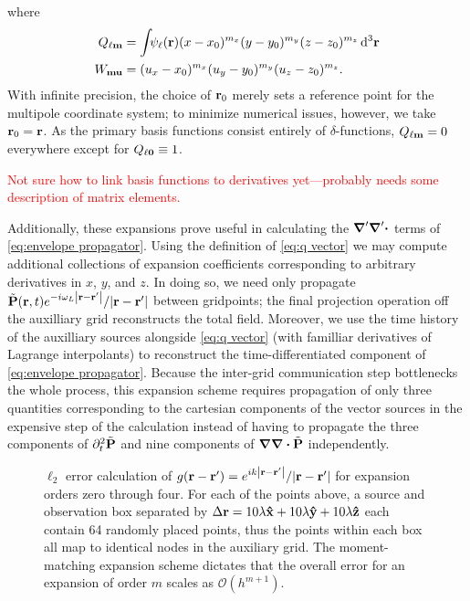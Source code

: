 where
\begin{subequations}
  \begin{align}
    Q_{\ell \vb{m}} &= \int_{} \psi_\ell(\vb{r}) (x - x_0)^{m_x} (y - y_0)^{m_y} (z - z_0)^{m_z} \dd[3]{\vb{r}} \label{eq:q vector}\\
    W_{\vb{m}\vb{u}} &= (u_x - x_0)^{m_x} (u_y - y_0)^{m_y} (u_z - z_0)^{m_z} \label{eq:w matrix}.
  \end{align}
\end{subequations}
With infinite precision, the choice of $\vb{r}_0$ merely sets a reference point for the multipole coordinate system; to minimize numerical issues, however, we take $\vb{r}_0 = \vb{r}$.
As the primary basis functions consist entirely of $\delta$-functions, $Q_{\ell\vb{m}} = 0$ everywhere except for $Q_{\ell \vb{0}} \equiv 1$.

\textcolor{red}{Not sure how to link basis functions to derivatives yet---probably needs some description of matrix elements.}

Additionally, these expansions prove useful in calculating the $\grad' \grad' \boldsymbol{\cdot}$ terms of \cref{eq:envelope propagator}.
Using the definition of \cref{eq:q vector} we may compute additional collections of expansion coefficients corresponding to arbitrary derivatives in $x$, $y$, and $z$.
In doing so, we need only propagate $\tilde{\vb{P}}(\vb{r}, t)e^{-i \omega_L \abs{\vb{r} - \vb{r}'}}/\abs{\vb{r} - \vb{r}'}$ between gridpoints; the final projection operation off the auxilliary grid reconstructs the total field.
Moreover, we use the time history of the auxilliary sources alongside \cref{eq:q vector} (with familliar derivatives of Lagrange interpolants) to reconstruct the time-differentiated component of \cref{eq:envelope propagator}.
Because the inter-grid communication step bottlenecks the whole process, this expansion scheme requires propagation of only three quantities corresponding to the cartesian components of the vector sources in the expensive step of the calculation instead of having to propagate the three components of $\partial_t^2 \tilde{\vb{P}}$ and nine components of $\grad \grad \boldsymbol{\cdot} \tilde{\vb{P}}$ independently.


\begin{figure}
  \centering
  
  \caption{\label{fig:grid convergence} $\ell_2$ error calculation of $g(\vb{r} - \vb{r}') = e^{i k \abs{\vb{r} - \vb{r}'}}/{\abs{\vb{r} - \vb{r}'}}$ for expansion orders zero through four.
    For each of the points above, a source and observation box separated by $\Delta \vb{r} = 10\lambda \vu{x} + 10 \lambda \vu{y} + 10 \lambda \vu{z}$ each contain 64 randomly placed points, thus the points within each box all map to identical nodes in the auxiliary grid. 
    The moment-matching expansion scheme dictates that the overall error for an expansion of order $m$ scales as $\mathcal{O}(h^{m + 1})$.
  }
\end{figure}
